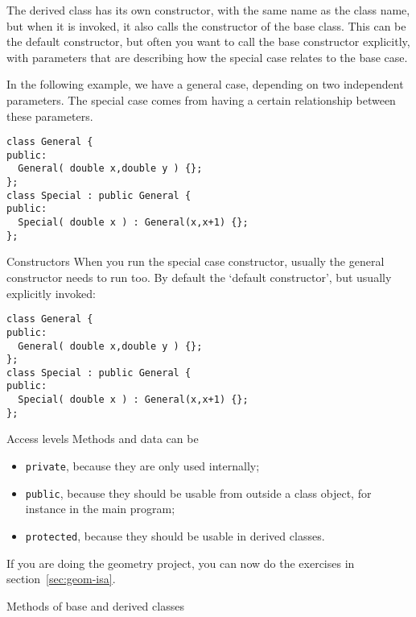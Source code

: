 The derived class has its own constructor, with the same name as the
class name, but when it is invoked, it also calls the constructor of
the base class. This can be the default constructor, but often you
want to call the base constructor explicitly, with parameters that are
describing how the special case relates to the base case.

In the following example, we have a general case, depending on two
independent parameters.
The special case comes from having a certain relationship between
these parameters.

\begin{lstlisting}
class General {
public:
  General( double x,double y ) {};
};
class Special : public General {
public:
  Special( double x ) : General(x,x+1) {};
};
\end{lstlisting}

\begin{slide}{Constructors}
  \label{sl:obj-derive-construct}
  When you run the special case constructor, usually the general
  constructor needs to run too. By default the `default constructor',
  but usually explicitly invoked:
\begin{lstlisting}
class General {
public:
  General( double x,double y ) {};
};
class Special : public General {
public:
  Special( double x ) : General(x,x+1) {};
};
\end{lstlisting}
\end{slide}

\begin{block}{Access levels}
  \label{sl:private-etc}
  Methods and data can be
  \begin{itemize}
  \item \lstinline{private}, because they are only used internally;
  \item \lstinline{public}, because they should be usable from outside a class
    object, for instance in the main program;
  \item \lstinline{protected}, because they should be usable in derived classes.
  \end{itemize}
\end{block}

\begin{exercise}
  If you are doing the geometry project, 
  you can now do the exercises in section~\ref{sec:geom-isa}.
\end{exercise}

 {Methods of base and derived classes}
\label{sec:derive-method}

